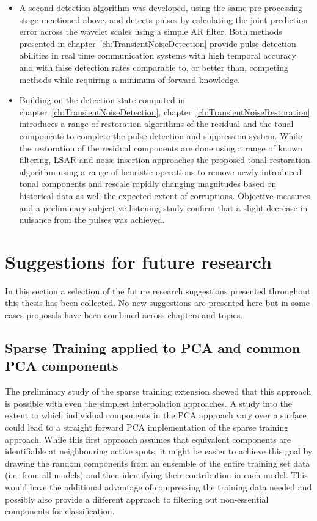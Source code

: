 \begin{itemize}
  \item A second detection algorithm was developed, using the same pre-processing stage mentioned above, and detects pulses by calculating the joint prediction error across the wavelet scales using a simple AR filter. Both methods presented in chapter~\ref{ch:TransientNoiseDetection} provide pulse detection abilities in real time communication systems with high temporal accuracy and with false detection rates comparable to, or better than, competing methods while requiring a minimum of forward knowledge.
  \item Building on the detection state computed in chapter~\ref{ch:TransientNoiseDetection}, chapter~\ref{ch:TransientNoiseRestoration} introduces a range of restoration algorithms of the residual and the tonal components to complete the pulse detection and suppression system. While the restoration of the residual components are done using a range of known filtering, LSAR and noise insertion approaches the proposed tonal restoration algorithm using a range of heuristic operations to remove newly introduced tonal components and rescale rapidly changing magnitudes based on historical data as well the expected extent of corruptions. Objective measures and a preliminary subjective listening study confirm that a slight decrease in nuisance from the pulses was achieved.
\end{itemize}


\section{Suggestions for future research}
In this section a selection of the future research suggestions presented throughout this thesis has been collected. No new suggestions are presented here but in some cases proposals have been combined across chapters and topics.

\subsection{Sparse Training applied to PCA and common PCA components}
The preliminary study of the sparse training extension showed that this approach is possible with even the simplest interpolation approaches. A study into the extent to which individual components in the PCA approach vary over a surface could lead to a straight forward PCA implementation of the sparse training approach. While this first approach assumes that equivalent components are identifiable at neighbouring active spots, it might be easier to achieve this goal by drawing the random components from an ensemble of the entire training set data (i.e. from all models) and then identifying their contribution in each model. This would have the additional advantage of compressing the training data needed and possibly also provide a different approach to filtering out non-essential components for classification.

